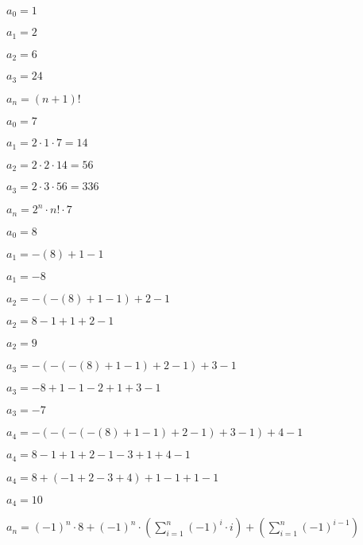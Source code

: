 \documentclass{exam}
\begin{document}
\begin{questions}
\begin{subparts}
\begin{center}

\(a_0 = 1\)

\(a_1 = 2\)

\(a_2 = 6\)

\(a_3 = 24\)

\(a_n = (n+1)!\)

\end{center}


\begin{center}

\(a_0 = 7\)

\(a_1 = 2 \cdot 1 \cdot 7 = 14\)

\(a_2 = 2 \cdot 2 \cdot 14 = 56\)

\(a_3 = 2 \cdot 3 \cdot 56 = 336\)

\(a_n = 2^n \cdot n! \cdot 7 \)

\end{center}



\begin{center}

\(a_0 = 8\)
\vspace{5px}

\(a_1 = -(8) + 1 - 1\)

\(a_1 = -8\)
\vspace{5px}

\(a_2 = -(-(8) + 1 - 1) + 2 - 1 \)

\(a_2 = 8 - 1 + 1 + 2 - 1 \)

\(a_2 = 9\)
\vspace{5px}

\(a_3 = -(-(-(8) + 1 - 1) + 2 - 1) + 3 - 1 \)

\(a_3 = -8 + 1 - 1 - 2 + 1 + 3 - 1\)

\(a_3 = -7\)
\vspace{5px}

\(a_4 = -(-(-(-(8) + 1 - 1) + 2 - 1) + 3 - 1) + 4 - 1 \)

\(a_4 = 8 - 1 + 1 + 2 - 1 - 3 + 1 + 4 - 1 \)

\(a_4 = 8 + (-1 + 2 - 3 + 4) + 1 - 1 + 1 - 1 \)

\(a_4 = 10\)
\vspace{5px}

\(a_n = (-1)^n \cdot 8 + (-1)^n \cdot (\sum^n_{i=1} (-1)^i \cdot i) + (\sum^n_{i=1} (-1)^{i-1}) \)


\end{center}
\end{subparts}
\end{questions}
\end{document}

